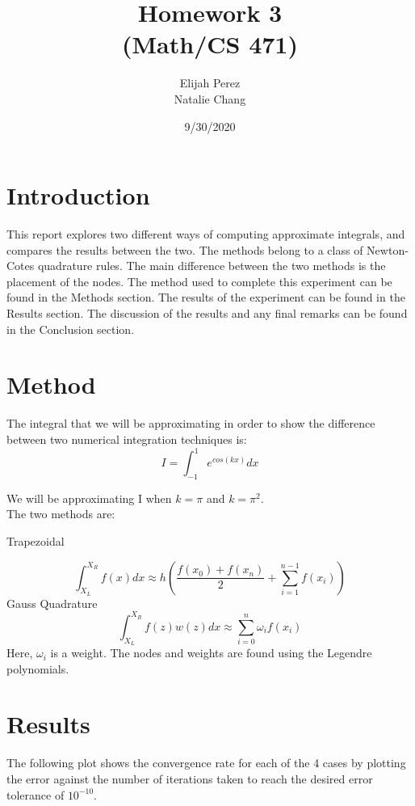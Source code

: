 \documentclass[12pt]{article}
\title{Homework 3 \protect  \\(Math/CS 471)}
\author{Elijah Perez \protect \newline \\Natalie Chang}
\date{\vfill 9/30/2020}
\begin{document}
	\maketitle
	\pagebreak
	\section{Introduction}
     This report explores two different ways of computing approximate integrals, and compares the results between the two. The methods belong to a class of Newton-Cotes quadrature rules. The main difference between the two methods is the placement of the nodes. The method used to complete this experiment can be found in the Methods section. The results of the experiment can be found in the Results section. The discussion of the results and any final remarks can be found in the Conclusion section.
     
	\section{Method}
	The integral that we will be approximating in order to show the difference between two numerical integration techniques is:
	\begin{equation}
		I = \int_{-1}^1  e^{cos(kx)} dx
	\end{equation}
	\begin{center}
	We will be approximating I when $k=\pi$ and $k=\pi^2$.
    \linebreak\\ 
	The two methods are:
	\end{center}
	Trapezoidal

	\begin{equation}
		\int_{X_L}^{X_R} f(x) dx \approx h(\frac{f(x_0) + f(x_n)}{2} + \sum_{i=1}^{n-1} f(x_i))
	\end{equation}
	\linebreak
	Gauss Quadrature 
	\begin{equation}
			\int_{X_L}^{X_R} f(z)w(z) dx \approx \sum_{i=0}^{n} \omega_i f(x_i)
	\end{equation}
	Here, $\omega_i$ is a weight. The nodes and weights are found using the Legendre polynomials.

	\section{Results}
	The following plot shows the convergence rate for each of the 4 cases by plotting the error against the number of iterations taken to reach the desired error tolerance of $10^{-10}$. 
	\pagebreak
	
\end{document}
